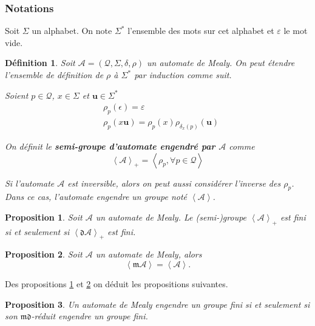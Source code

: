 \documentclass[11pt,a4paper]{article}
\newtheorem{prop}{Proposition}
\newtheorem{definition}{Définition}
\begin{document}
\subsubsection*{Notations}
Soit $\Sigma$ un alphabet. On note $\Sigma^*$ l'ensemble des mots sur cet alphabet et $\varepsilon$ le mot vide.

\begin{definition}
  Soit $\mathcal{A}=\left(\mathcal{Q}, \Sigma, \delta, \rho\right)$ un automate de Mealy. On peut étendre l'ensemble de définition de $\rho$ à $\Sigma^*$ par induction comme suit.

  Soient $p\in\mathcal{Q}$, $x\in\Sigma$ et $\textbf{u}\in\Sigma^*$
  \begin{align*}
    &\rho_p(\epsilon)=\varepsilon \\
    &\rho_p(x\textbf{u})=\rho_p(x)\rho_{\delta_x(p)}(\textbf{u})
  \end{align*}

  On définit le \textbf{semi-groupe d'automate engendré par $\mathcal{A}$} comme
  \begin{equation*}
    \left<\mathcal{A}\right>_+=\left<\rho_p, \forall p\in\mathcal{Q}\right>
  \end{equation*}

  Si l'automate $\mathcal{A}$ est inversible, alors on peut aussi considérer l'inverse des $\rho_p$. Dans ce cas, l'automate engendre un groupe noté $\left<\mathcal{A}\right>$.

\end{definition}

\begin{prop}{\cite{DBLP:journals/corr/abs-1105-4725}}
  \label{prop:finitude-d}
  Soit $\mathcal{A}$ un automate de Mealy. Le (semi-)groupe $\left<\mathcal{A}\right>_+$ est fini si et seulement si $\left<\mathfrak{d}\mathcal{A}\right>_+$ est fini.
\end{prop}

\begin{prop}
  \label{prop:finitude-m}
  Soit $\mathcal{A}$ un automate de Mealy, alors
  \[ \left<\mathfrak{m}\mathcal{A}\right> = \left<\mathcal{A}\right>. \]
\end{prop}

Des propositions \ref{prop:finitude-d} et \ref{prop:finitude-m} on déduit les propositions suivantes.

\begin{prop}
  \label{prop:md-trivial}
  Un automate de Mealy engendre un groupe fini si et seulement si son $\mathfrak{md}$-réduit engendre un groupe fini.
\end{prop}
\end{document}
